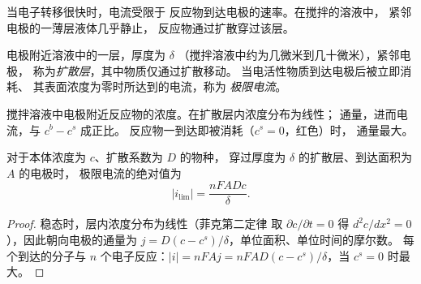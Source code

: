 当电子转移很快时，电流受限于
反应物到达电极的速率。在搅拌的溶液中，
紧邻电极的一薄层液体几乎静止，
反应物通过扩散穿过该层。

\begin{definition}[扩散层与极限电流]\label{def:b2:current-potential-curves:limiting-current}
电极附近溶液中的一层，厚度为 $\delta$
（搅拌溶液中约为几微米到几十微米），紧邻电极，
称为\emph{扩散层}，其中物质仅通过扩散移动。
当电活性物质到达电极后被立即消耗、
其表面浓度为零时所达到的电流，称为
\emph{极限电流}。
\end{definition}

\begin{omfigure}

{\small 搅拌溶液中电极附近反应物的浓度。在扩散层内浓度分布为线性；
通量，进而电流，与 $c^b - c^s$ 成正比。
反应物一到达即被消耗（$c^s = 0$，红色）时，
通量最大。}
\end{omfigure}

\begin{theorem}[极限电流]\label{thm:b2:current-potential-curves:limiting}
对于本体浓度为 $c$、扩散系数为 $D$ 的物种，
穿过厚度为 $\delta$ 的扩散层、到达面积为 $A$ 的电极时，
极限电流的绝对值为
\[
  |i_{\lim}| = \frac{nFADc}{\delta} .
\]
\end{theorem}

\begin{proof}
稳态时，层内浓度分布为线性（菲克第二定律
取 $\partial c/\partial t = 0$ 得 $d^2c/dx^2 = 0$），因此朝向电极的通量为
$j = D(c - c^s)/\delta$，单位面积、单位时间的摩尔数。
每个到达的分子与 $n$ 个电子反应：$|i| = nFAj =
nFAD(c - c^s)/\delta$，当 $c^s = 0$ 时最大。
\end{proof}

